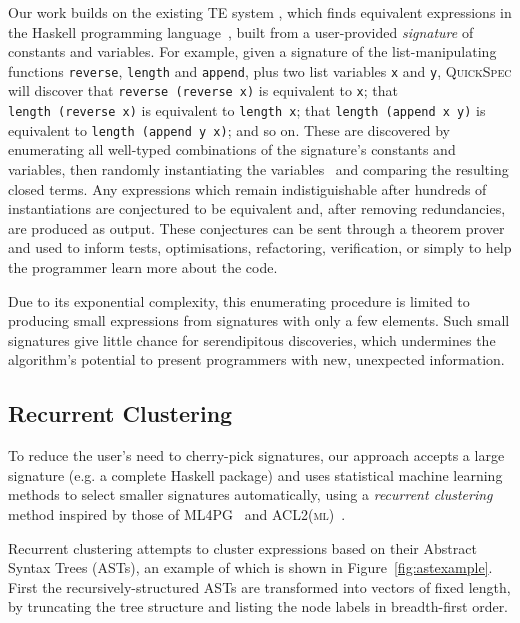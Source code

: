 \documentclass[]{default}
\begin{document}
Our work builds on the existing TE system
, which finds equivalent expressions
in the Haskell programming language~\cite{marlow2010haskell}, built from a user-provided
\emph{signature} of constants and variables. For example, given a
signature of the list-manipulating functions \texttt{reverse},
\texttt{length} and \texttt{append}, plus two list variables \texttt{x}
and \texttt{y}, \textsc{QuickSpec} will discover that
\texttt{reverse\ (reverse\ x)} is equivalent to \texttt{x}; that
\texttt{length\ (reverse\ x)} is equivalent to \texttt{length\ x}; that
\texttt{length\ (append\ x\ y)} is equivalent to
\texttt{length\ (append\ y\ x)}; and so on. These are discovered by
enumerating all well-typed combinations of the signature's constants and
variables, then randomly instantiating the variables~\cite{claessen2011quickcheck} and comparing the
resulting closed terms. Any expressions which remain indistiguishable
after hundreds of instantiations are conjectured to be equivalent and,
after removing redundancies, are produced as output. These conjectures
can be sent through a theorem prover~\cite{claessen2013automating} and used to inform tests,
optimisations, refactoring, verification, or simply to help the
programmer learn more about the code.

Due to its exponential complexity, this enumerating procedure is limited
to producing small expressions from signatures with only a few elements.
Such small signatures give little chance for serendipitous discoveries,
which undermines the algorithm's potential to present programmers with
new, unexpected information.

\subsection{Recurrent Clustering}\label{recurrent-clustering}

To reduce the user's need to cherry-pick signatures, our approach
accepts a large signature (e.g. a complete Haskell package) and uses
statistical machine learning methods to select smaller signatures
automatically, using a \emph{recurrent clustering} method inspired by
those of \textsc{ML4PG}~\cite{journals/corr/abs-1212-3618} and \textsc{ACL2(ml)}~\cite{Heras.Komendantskaya.Johansson.ea:2013}.

Recurrent clustering attempts to cluster expressions based on their
Abstract Syntax Trees (ASTs), an example of which is shown in Figure~\ref{fig:astexample}. First the recursively-structured ASTs are
transformed into vectors of fixed length, by truncating the tree
structure and listing the node labels in breadth-first order.
\end{document}
